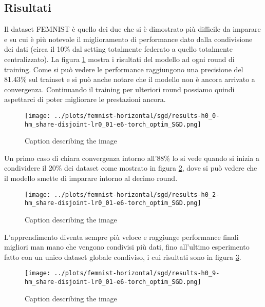 \subsection{Risultati}
Il dataset FEMNIST è quello dei due che si è dimostrato più difficile 
da imparare e su cui è più notevole il miglioramento di performance 
dato dalla condivisione dei dati (circa il 10\% dal setting totalmente
federato a quello totalmente centralizzato). La figura \ref{fig:femnists0sgd}
mostra i risultati del modello ad ogni round di training. Come si può 
vedere le performance raggiungono una precisione del 81.43\% sul trainset 
e si può anche notare che il modello non è ancora arrivato a convergenza.
Continuando il training per ulteriori round possiamo quindi aspettarci 
di poter migliorare le prestazioni ancora.
\begin{figure}[htbp]  %
    \centering
    \texttt{[image: ../plots/femnist-horizontal/sgd/results-h0\_0-hm\_share-disjoint-lr0\_01-e6-torch\_optim\_SGD.png]}  %
    \caption{Caption describing the image}
    \label{fig:femnists0sgd}
\end{figure}

Un primo caso di chiara convergenza intorno all'88\% lo si vede quando 
si inizia a condividere il 20\% dei dataset come mostrato in figura 
\ref{fig:femnists2sgd}, dove si può vedere che il modello smette di 
imparare intorno al decimo round.
\begin{figure}[htbp]  %
    \centering
    \texttt{[image: ../plots/femnist-horizontal/sgd/results-h0\_2-hm\_share-disjoint-lr0\_01-e6-torch\_optim\_SGD.png]}  %
    \caption{Caption describing the image}
    \label{fig:femnists2sgd}
\end{figure}

L'apprendimento diventa sempre più veloce e raggiunge performance 
finali migliori man mano che vengono condivisi più dati, fino all'ultimo 
esperimento fatto con un unico dataset globale condiviso, i cui risultati 
sono in figura \ref{fig:femnists9sgd}.
\begin{figure}[htbp]  %
    \centering
    \texttt{[image: ../plots/femnist-horizontal/sgd/results-h0\_9-hm\_share-disjoint-lr0\_01-e6-torch\_optim\_SGD.png]}  %
    \caption{Caption describing the image}
    \label{fig:femnists9sgd}
\end{figure}


